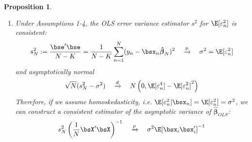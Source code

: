 \documentclass[12pt]{article}
\theoremstyle{plain}
\newtheorem{prop}[thm]{Proposition}
\theoremstyle{definition}
\theoremstyle{remark}
\newcommand{\bshatbeta}{\boldsymbol{\hat{\beta}}}
\newcommand{\pto}{\xrightarrow{p}}
\newcommand{\dto}{\xrightarrow{d}}
\newcommand{\sumnN}{\sum^N_{n=1}}
\begin{document}
\begin{prop}
\begin{enumerate}
  \item Under Assumptions 1-4, the OLS error variance estimator $s^2$
    for $\E[\varepsilon_n^2]$ is consistent:
    \begin{align*}
      s^2_N := \frac{\bse' \bse}{N-K}
      =\frac{1}{N-K} \sumnN (y_n-\bsx_n\bshatbeta_N)^2
      \quad\pto\quad \sigma^2 = \E[\varepsilon_n^2]
    \end{align*}
    and asymptotically normal
    \begin{align*}
      \sqrt{N}(s^2_N - \sigma^2)
      \quad\dto\quad
      N\left(0,\E[\varepsilon_n^4]-\E[\varepsilon^2_n]^2\right)
    \end{align*}
    Therefore, if we assume homoskedasticity, i.e.
    $\E[\varepsilon_n^2|\bsx_n]=\E[\varepsilon_n^2]=\sigma^2$, we
    can construct a consistent estimator of the asymptotic variance of
    $\bshatbeta_{OLS}$:
    \begin{align*}
      s_N^2\left(\frac{1}{N} \bsX'\bsX\right)^{-1}
      \quad\pto\quad
      \sigma^2\E[\bsx_i\bsx_i']^{-1}
    \end{align*}
\end{enumerate}
\end{prop}
\end{document}
